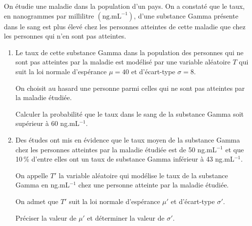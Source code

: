 \documentclass[12pt,french]{article}
\begin{document}
\begin{question}[subtitle={Polynésie septembre 2015}]
On étudie une maladie dans la population d'un pays. On a constaté que le taux, en nanogrammes
par millilitre $\left(\text{ng.mL}^{-1}\right)$, d'une substance Gamma présente dans le sang est plus élevé chez les personnes atteintes de cette maladie que chez les personnes qui n'en sont pas
atteintes.

\medskip

\begin{enumerate}
\item Le taux de cette substance Gamma dans la population des personnes qui ne sont pas
atteintes par la maladie est modélisé par une variable aléatoire $T$ qui suit la loi normale
d'espérance $\mu = 40$ et d'écart-type $\sigma = 8$.

On choisit au hasard une personne parmi celles qui ne sont pas atteintes par la maladie
étudiée.

Calculer la probabilité que le taux dans le sang de la substance Gamma soit supérieur
à 60 ng.mL$^{-1}$.
\item Des études ont mis en évidence que le taux moyen de la substance Gamma chez les
personnes atteintes par la maladie étudiée est de 50 ng.mL$^{-1}$ et que 10\,\% d'entre elles
ont un taux de substance Gamma inférieur à 43 ng.mL$^{-1}$.

On appelle $T'$ la variable aléatoire qui modélise le taux de la substance Gamma en
ng.mL$^{-1}$ chez une personne atteinte par la maladie étudiée.

On admet que $T'$ suit la loi normale d'espérance $\mu'$ et d'écart-type $\sigma'$.

Préciser la valeur de $\mu'$ et déterminer la valeur de $\sigma'$.
\end{enumerate}
\end{question}
\end{document}

